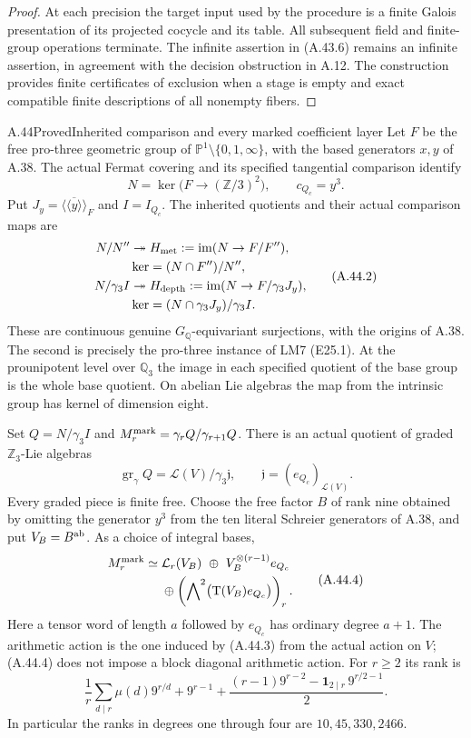 \begin{proof}
At each precision the target input used by the procedure
is a finite Galois presentation of its projected cocycle
and its table. All subsequent field and finite-group
operations terminate. The infinite assertion in
(A.43.6) remains an infinite assertion, in agreement
with the decision obstruction in A.12. The construction
provides finite certificates of exclusion when a stage
is empty and exact compatible finite descriptions of
all nonempty fibers.
\end{proof}

\begin{statement}{A.44}{Proved}{Inherited comparison and every marked coefficient layer}
Let $F$ be the free pro-three geometric group of
$\mathbb P^1\setminus\{0,1,\infty\}$, with the based
generators $x,y$ of A.38. The actual Fermat covering and
its specified tangential comparison identify
\[
 N=\ker\bigl(F\longrightarrow(\mathbb Z/3)^2\bigr),
 \qquad c_{Q_c}=y^3.
 \tag{A.44.1}
\]
Put $J_y=\overline{\langle\!\langle y\rangle\!\rangle}_F$
and $I=I_{Q_c}$. The inherited quotients and their actual
comparison maps are
\[
\begin{aligned}
 N/N''&\twoheadrightarrow H_{\rm met}
       :=\operatorname{im}(N\to F/F''),\\
 &\ker=(N\cap F'')/N'',\\
 N/\gamma_3I&\twoheadrightarrow H_{\rm depth}
       :=\operatorname{im}(N\to F/\gamma_3J_y),\\
 &\ker=(N\cap\gamma_3J_y)/\gamma_3I.
\end{aligned}
 \tag{A.44.2}
\]
These are continuous genuine $G_{\mathbb Q}$-equivariant
surjections, with the origins of A.38. The second is
precisely the pro-three instance of LM7 (E25.1).
At the prounipotent level over $\mathbb Q_3$ the image in each
specified quotient of the base group is the whole base
quotient. On abelian Lie algebras the map from the
intrinsic group has kernel of dimension eight.

Set $Q=N/\gamma_3I$ and
$M_r^{\rm mark}=\gamma_rQ/\gamma_{r+1}Q$.
There is an actual quotient of graded $\mathbb Z_3$-Lie
algebras
\[
 \operatorname{gr}_{\gamma}Q
   =\mathcal L(V)/\gamma_3\mathfrak j,
 \qquad \mathfrak j=(e_{Q_c})_{\mathcal L(V)}.
 \tag{A.44.3}
\]
Every graded piece is finite free. Choose the free factor
$B$ of rank nine obtained by omitting the generator
$y^3$ from the ten literal Schreier generators of A.38,
and put $V_B=B^{\rm ab}$. As a choice of integral bases,
\[
\begin{aligned}
 M_r^{\rm mark}\simeq{}&
 \mathcal L_r(V_B)\ \oplus\
 V_B^{\otimes(r-1)}e_{Q_c}\\
 &{}\oplus\left(\bigwedge\nolimits^2
       \bigl(\mathrm T(V_B)e_{Q_c}\bigr)\right)_r.
\end{aligned}
 \tag{A.44.4}
\]
Here a tensor word of length $a$ followed by $e_{Q_c}$
has ordinary degree $a+1$. The arithmetic action is the
one induced by (A.44.3) from the actual action on $V$;
(A.44.4) does not impose a block diagonal arithmetic
action. For $r\ge2$ its rank is
\[
 \frac1r\sum_{d\mid r}\mu(d)9^{r/d}
 +9^{r-1}
 +\frac{(r-1)9^{r-2}
          -\mathbf1_{2\mid r}\,9^{r/2-1}}2.
 \tag{A.44.5}
\]
In particular the ranks in degrees one through four are
$10,45,330,2466$.


\end{statement}
